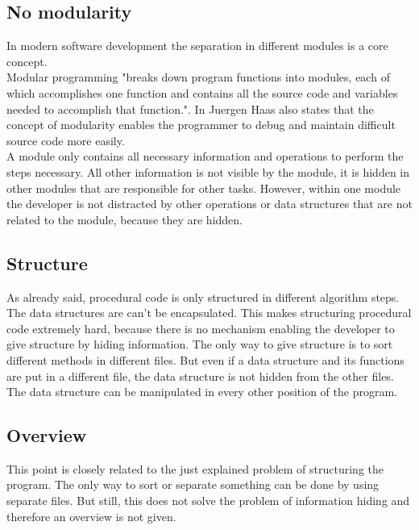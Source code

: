 \subsection*{No modularity}
\label{problem:nomodularity}
In modern software development the separation in different modules is a core concept.\\

Modular programming "breaks down program functions into modules, each of which accomplishes one function and contains all the source code and variables needed to accomplish that function."\cite{about}. In \cite{about} Juergen Haas also states that the concept of modularity enables the programmer to debug and maintain difficult source code more easily. \\

A module only contains all necessary information and operations to perform the steps necessary. All other information is not visible by the module, it is hidden in other modules that are responsible for other tasks. However, within one module the developer is not distracted by other operations or data structures that are not related to the module, because they are hidden. 

\subsection*{Structure}
As already said, procedural code is only structured in different algorithm steps. The data structures are can't be encapsulated. This makes structuring procedural code extremely hard, because there is no mechanism enabling the developer to give structure by hiding information. The only way to give structure is to sort different methods in different files. But even if a data structure and its functions are put in a different file, the data structure is not hidden from the other files. The data structure can be manipulated in every other position of the program.

\subsection*{Overview}
This point is closely related to the just explained problem of structuring the program. The only way to sort or separate something can be done by using separate files. But still, this does not solve the problem of information hiding and therefore an overview is not given.

